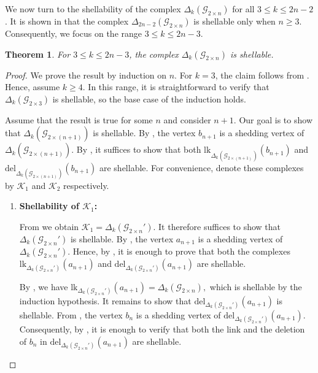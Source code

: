 \documentclass[11pt,reqno,a4paper]{amsart}
\newtheorem{theorem}{Theorem}[section]
\theoremstyle{definition}
\theoremstyle{theorem}
\newcommand{\kcut}{\Delta_{k}}
\newcommand{\twogg}{\mathcal{G}_{2\times n}}
\newcommand{\twoggn}{\mathcal{G}_{2\times \left(n+1\right)}}
\newcommand{\twoggp}{\mathcal{G}_{2\times n}'}
\newcommand{\lno}{\left(}
\newcommand{\rno}{\right)}
\newcommand{\K}{\mathcal{K}}
\newcommand{\lk}{\mathrm{lk}}
\newcommand{\del}{\mathrm{del}}
\theoremstyle{remark}
\begin{document}
	We now turn to the shellability of the complex $\kcut\lno \twogg \rno$ for all $3 \leq k \leq 2n-2$. It is shown in \cite[Proposition 5.1]{bayer2024cutB} that the complex $\Delta_{2n-2}\lno \twogg \rno$ is shellable only when $n \geq 3$. Consequently, we focus on the range $3 \leq k \leq 2n-3$.
	
	
	\begin{theorem}\label{lemma: Shellability of 2n'gg}
		For $3 \leq k \leq 2n-3$, the complex $\kcut \lno \twogg \rno$ is shellable.
	\end{theorem}
	
	\begin{proof}
		We prove the result by induction on $n$. For $k=3$, the claim follows from \cite[Proposition~5.6]{bayer2024cut}. Hence, assume $k \geq 4$. In this range, it is straightforward to verify that $\Delta_k(\mathcal{G}_{2\times 3})$ is shellable, so the base case of the induction holds.
		
		Assume that the result is true for some $n$ and consider $n+1$. Our goal is to show that $\kcut \lno \twoggn \rno$ is shellable. By , the vertex $b_{n+1}$ is a shedding vertex of $\kcut \lno \twoggn \rno$. By , it suffices to show that both $\lk_{\kcut \lno \twoggn\rno}\lno b_{n+1} \rno$ and $\del_{\kcut \lno \twoggn\rno}\lno b_{n+1} \rno$ are shellable. For convenience, denote these complexes by $\K_1$ and $\K_2$ respectively.
	
	
	\begin{enumerate}
		\item \textbf{Shellability of $\K_1$:}
		
		From  we obtain $\K_1 = \kcut\lno \twoggp \rno$. It therefore suffices to show that $\kcut\lno \twoggp \rno$ is shellable. By , the vertex $a_{n+1}$ is a shedding vertex of $\kcut\lno \twoggp \rno$. Hence, by , it is enough to prove that both the complexes $\lk_{\kcut\lno \twoggp \rno}\lno a_{n+1} \rno$ and $ \del_{\kcut \lno \twoggp \rno}(a_{n+1})$ are shellable.
		
		By , we have $\lk_{\kcut\lno \twoggp \rno}\lno a_{n+1} \rno = \kcut\lno \twogg \rno,$ which is shellable by the induction hypothesis. It remains to show that $\del_{\kcut \lno \twoggp \rno}(a_{n+1})$ is shellable. From , the vertex $b_n$ is a shedding vertex of $\del_{\kcut\lno\twoggp\rno}\lno a_{n+1} \rno$. Consequently, by , it is enough to verify that both the link and the deletion of $b_n$ in $\del_{\kcut\lno\twoggp\rno}\lno a_{n+1} \rno$ are shellable.
		

\end{enumerate}
\end{proof}
\end{document}
